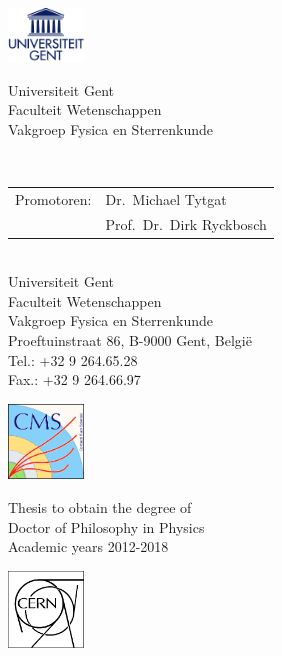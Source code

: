 \documentclass[10pt,a4paper,twoside,dutch,english,openright,leqno]{book}                %
\begin{document}

\clearpage{\pagestyle{empty}\cleardoublepage}
\thispagestyle{empty}

\normalsize

\noindent
\begin{minipage}{3cm}%
   \includegraphics*[width=2cm]{UGentlogo}%
 \end{minipage}\hfill
 \begin{minipage}{8cm}
 \raggedleft
 \textsf{Universiteit Gent\\
 Faculteit Wetenschappen\\
 Vakgroep Fysica en Sterrenkunde}
 \end{minipage}
\\[2cm]

\vfill
\noindent \begin{tabular}{ @{} l l}
Promotoren: & Dr.\ Michael Tytgat\\
 & Prof.\ Dr.\ Dirk Ryckbosch\\
\end{tabular}
\\[2cm]

\noindent Universiteit Gent \\
\noindent Faculteit Wetenschappen\\
[0.3cm]
\noindent Vakgroep Fysica en Sterrenkunde \\
\noindent Proeftuinstraat 86, B-9000 Gent, Belgi\"e\\
[0.3cm]
\noindent Tel.: +32 9 264.65.28\\
\noindent Fax.: +32 9 264.66.97

\vfill

 \begin{minipage}{2.0cm}%
     \includegraphics*[width=2.0cm]{CMS}%
 \end{minipage}\hfill
 \begin{minipage}{6cm}
 \centering
 \textsf{Thesis to obtain the degree of\\
 Doctor of Philosophy in Physics\\
 Academic years 2012-2018}
 \end{minipage}\hfill
 \begin{minipage}{2.0cm}%
     \includegraphics*[width=2.0cm]{CERN}%
 \end{minipage}\hfill
\clearpage{\pagestyle{empty}\cleardoublepage}
\end{document}
